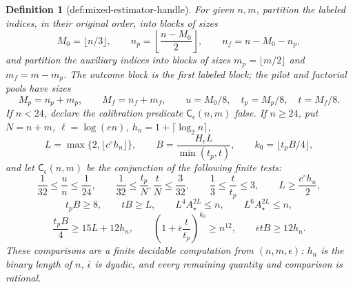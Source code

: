 \documentclass{article}
\newtheorem{definition}{Definition}
\begin{document}
\begin{definition}[def:mixed-estimator-handle]
For given \(n,m\), partition the labeled indices, in their original order, into blocks of sizes
\[
 M_0=\lfloor n/3\rfloor,\qquad
 n_p=\left\lfloor\frac{n-M_0}{2}\right\rfloor,
 \qquad n_f=n-M_0-n_p,
\]
and partition the auxiliary indices into blocks of sizes
\(m_p=\lfloor m/2\rfloor\) and \(m_f=m-m_p\).  The outcome block is the first labeled block; the pilot and factorial pools have sizes
\[
 M_p=n_p+m_p,\qquad M_f=n_f+m_f,\qquad
 u=M_0/8,\quad t_p=M_p/8,\quad t=M_f/8.                            \tag{C2}
\]
If \(n<24\), declare the calibration predicate \(\mathsf C_\epsilon(n,m)\) false.  If \(n\ge24\), put \(N=n+m\), \(\ell=\log(en)\), \(h_n=1+\lceil\log_2 n\rceil\),
\[
 L=\max\{2,\lfloor c^\circ h_n\rfloor\},\qquad
 B=\frac{H_\epsilon L}{\min(t_p,t)},\qquad
 k_0=\lfloor t_pB/4\rfloor,                                          \tag{C3}
\]
and let \(\mathsf C_\epsilon(n,m)\) be the conjunction of the following finite tests:
\[
 \frac1{32}\le\frac un\le\frac1{24},\qquad
 \frac1{32}\le\frac{t_p}{N},\frac tN\le\frac3{32},\qquad
 \frac13\le\frac t{t_p}\le3,\qquad L\ge\frac{c^\circ h_n}{2},   \tag{C4}
\]
\[
 t_pB\ge8,\qquad tB\ge L,\qquad
 L^4A_\star^{2L}\le n,\qquad L^6A_\star^{2L}\le n,               \tag{C5}
\]
\[
 \frac{t_pB}{4}\ge15L+12h_n,\qquad
 \left(1+\bar\epsilon\frac t{t_p}\right)^{k_0}\ge n^{12},
 \qquad \bar\epsilon tB\ge12h_n.                                  \tag{C6}
\]
These comparisons are a finite decidable computation from \((n,m,\epsilon)\): \(h_n\) is the binary length of \(n\), \(\bar\epsilon\) is dyadic, and every remaining quantity and comparison is rational.


\end{definition}
\end{document}
